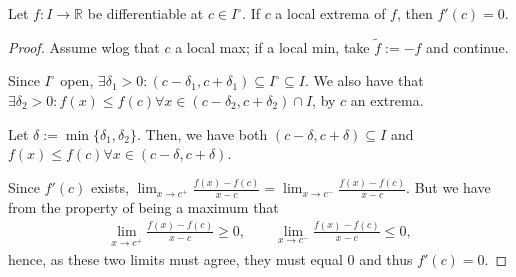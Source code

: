 \begin{lemma}
    Let $f : I \to \mathbb{R}$ be differentiable at $c \in I^\circ$. If $c$ a local extrema of $f$, then $f'(c) = 0$.
\end{lemma}
\begin{proof}
    Assume wlog that $c$ a local max; if a local min, take $\tilde f :=-f$ and continue.

    Since $I^\circ$ open, $\exists \delta_1 > 0 : (c- \delta_1, c + \delta_1) \subseteq I^\circ \subseteq I$. We also have that $\exists \delta_2 > 0 : f(x) \leq f(c) \forall x \in (c - \delta_2, c + \delta_2) \cap I$, by $c$ an extrema.

    Let $\delta := \min \{\delta_1, \delta_2\}$. Then, we have both $(c - \delta, c + \delta) \subseteq I$ and $f(x) \leq f(c) \forall x \in (c - \delta, c + \delta)$. 
    
    Since $f'(c)$ exists, $\lim_{x \to c^+} \frac{f(x) - f(c)}{x-c} = \lim_{x \to c^-} \frac{f(x) - f(c)}{x - c}$. But we have from the property of being a maximum that \begin{align*}
        \lim_{x \to c^+} \frac{f(x) - f(c)}{x-c} \geq 0, \qquad \lim_{x \to c^-} \frac{f(x) - f(c)}{x - c}\leq 0,
    \end{align*}
    hence, as these two limits must agree, they must equal $0$ and thus $f'(c) = 0$.
\end{proof}